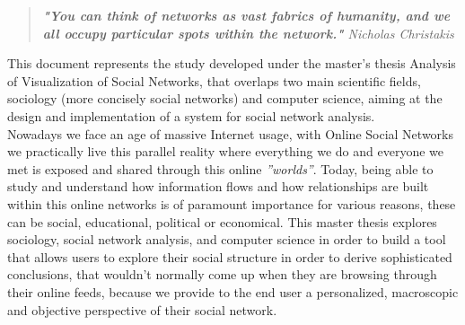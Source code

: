 
\begin{quote}
\textit{\textbf{"You can think of networks as vast fabrics of humanity, and we all occupy particular spots within the network."} Nicholas Christakis}
\end{quote}

This document represents the study developed under the master's thesis Analysis of Visualization of Social Networks, that overlaps
two main scientific fields, sociology (more concisely social networks) and computer science, aiming at the design and implementation of a system for social network analysis.\\

Nowadays we face an age of massive Internet usage, with Online Social Networks we practically live this parallel reality where everything we do and everyone we met is exposed and shared through this online \textit{''worlds''}. Today, being able to study and understand how information flows and how relationships are built within this online networks is of paramount importance for various reasons, these can be social, educational, political or economical. This master thesis explores sociology, social network analysis, and computer science in order to build a tool that allows users to explore their social structure in order to derive sophisticated conclusions, that wouldn't normally come up when they are browsing through their online feeds, because we provide to the end user a personalized, macroscopic and objective perspective of their social network.